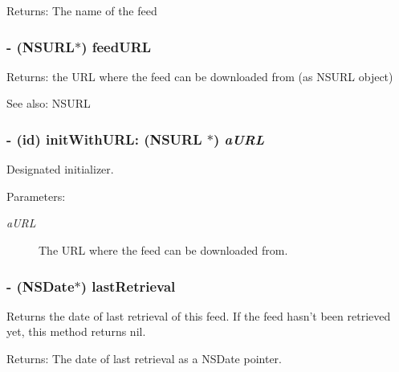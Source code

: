 \begin{Desc}
\item[Returns:]The name of the feed\end{Desc}
\subsubsection{\setlength{\rightskip}{0pt plus 5cm}- (NSURL$\ast$) feed\-URL }\label{interfaceRSSFeed_a11}


\begin{Desc}
\item[Returns:]the URL where the feed can be downloaded from (as NSURL object) \end{Desc}
\begin{Desc}
\item[See also:]NSURL\end{Desc}
\subsubsection{\setlength{\rightskip}{0pt plus 5cm}- (id) init\-With\-URL: (NSURL $\ast$) {\em a\-URL}}\label{interfaceRSSFeed_a1}


Designated initializer.

\begin{Desc}
\item[Parameters:]
\begin{description}
\item[{\em a\-URL}]The URL where the feed can be downloaded from.\end{description}
\end{Desc}
\subsubsection{\setlength{\rightskip}{0pt plus 5cm}- (NSDate$\ast$) last\-Retrieval }\label{interfaceRSSFeed_a19}


Returns the date of last retrieval of this feed. If the feed hasn't been retrieved yet, this method returns nil.

\begin{Desc}
\item[Returns:]The date of last retrieval as a NSDate pointer.\end{Desc}
